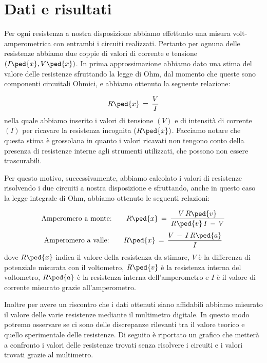 \section*{Dati e risultati}

Per ogni resistenza a nostra disposizione abbiamo effettuato una misura volt-amperometrica con entrambi i circuiti realizzati. Pertanto per ognuna delle resistenze abbiamo due coppie di valori di corrente e tensione $(I\ped{x}, V\ped{x})$.
In prima approssimazione abbiamo dato una stima del valore delle resistenze sfruttando la legge di Ohm, dal momento che queste sono componenti circuitali Ohmici, e abbiamo ottenuto la seguente relazione: 

\begin{equation}
	R\ped{x} \,=\, \frac{V}{I}
\end{equation}
%
nella quale abbiamo inserito i valori di tensione $(V)$ e di intensità di corrente $(I)$ per ricavare la resistenza incognita $(R\ped{x})$. Facciamo notare che questa stima è grossolana in quanto i valori ricavati non tengono conto della presenza di resistenze interne agli strumenti utilizzati, che possono non essere trascurabili.

Per questo motivo, successivamente, abbiamo calcolato i valori di resistenze risolvendo i due circuiti a nostra disposizione e sfruttando, anche in questo caso la legge integrale di Ohm, abbiamo ottenuto le seguenti relazioni:

\begin{equation}
	\text{Amperomero a monte:} \qquad R\ped{x} \,=\, \frac{V\,R\ped{v}}{R\ped{v}\,I\,-\,V}
\end{equation}
\begin{equation}
	\text{Amperomero a valle:} \qquad R\ped{x} \,=\, \frac{V\,-\,I\,R\ped{a}}{I}
\end{equation}
%
dove $R\ped{x}$ indica il valore della resistenza da stimare, $V$ è la differenza di potenziale misurata con il voltometro, $R\ped{v}$ è la resistenza interna del voltometro, $R\ped{a}$ è la resistenza interna dell'amperometro e $I$ è il valore di corrente misurato grazie all'amperometro.

Inoltre per avere un riscontro che i dati ottenuti siano affidabili abbiamo misurato il valore delle varie resistenze mediante il multimetro digitale. In questo modo potremo osservare se ci sono delle discrepanze rilevanti tra il valore teorico e quello sperimentale delle resistenze. Di seguito è riportato un grafico che metterà a confronto i valori delle resistenze trovati senza risolvere i circuiti e i valori trovati grazie al multimetro.

